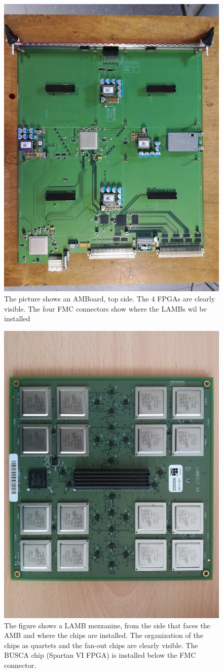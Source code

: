 \begin{figure}
\centering
\includegraphics[width=.6\linewidth,angle=90]{Images/AMBoard.jpg}
\caption{The picture shows an AMBoard, top side. The 4 FPGAs are
clearly visible. The four FMC connectors show where the LAMBs wil be
installed}
\label{fig:amboard_top}
\end{figure}

\begin{figure}
\centering

\includegraphics[width=.4\linewidth,angle=90]{Images/LAMB.jpg}

\caption{The figure shows a LAMB mezzanine, from the side that faces
the AMB and where the chips are installed. The organization of the chips
as quartets and the fan-out chips are clearly visible. The BUSCA
chip (Spartan VI FPGA) is installed below the FMC connector.}

\label{fig:lamb_bottom}
\end{figure}

